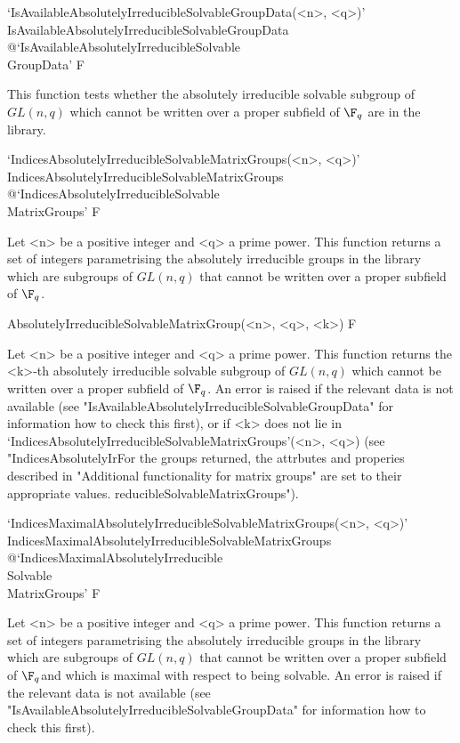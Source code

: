 \>`IsAvailableAbsolutelyIrreducibleSolvableGroupData(<n>, <q>)'%
{IsAvailableAbsolutelyIrreducibleSolvableGroupData}%
@{`IsAvailableAbsolutelyIrreducibleSolvable\\GroupData'} F

This function tests whether the
absolutely irreducible solvable subgroup of $GL(n,q)$ which
cannot be written over a proper subfield of $\F_q$ are in the {\IRREDSOL} library.


\>`IndicesAbsolutelyIrreducibleSolvableMatrixGroups(<n>, <q>)'%
{IndicesAbsolutelyIrreducibleSolvableMatrixGroups}%
@{`IndicesAbsolutelyIrreducibleSolvable\\MatrixGroups'} F

Let <n> be a  positive integer and <q> a prime power. This
function returns a set of integers parametrising the absolutely irreducible groups in the
{\IRREDSOL} library which are subgroups of $GL(n,q)$ that cannot be written over a proper
subfield of
$\F_q$.


\>AbsolutelyIrreducibleSolvableMatrixGroup(<n>, <q>, <k>) F

Let <n> be a  positive integer and <q> a prime power. This
function returns the <k>-th absolutely irreducible solvable subgroup of $GL(n,q)$ which
cannot be written over a proper subfield of $\F_q$. An error is raised if the relevant
data is not available (see "IsAvailableAbsolutelyIrreducibleSolvableGroupData" for information 
how to check this first), or if <k> does not lie in
`IndicesAbsolutelyIrreducibleSolvableMatrixGroups'(<n>, <q>)
(see "IndicesAbsolutelyIrFor the groups returned, the attrbutes and properies described in
"Additional functionality for matrix groups" are set to their appropriate values.
reducibleSolvableMatrixGroups").


\>`IndicesMaximalAbsolutelyIrreducibleSolvableMatrixGroups(<n>, <q>)'%
{IndicesMaximalAbsolutelyIrreducibleSolvableMatrixGroups}%
@{`IndicesMaximalAbsolutelyIrreducible\\Solvable\\MatrixGroups'} F

Let <n> be a  positive integer and <q> a prime power. This
function returns a set of integers parametrising the absolutely irreducible groups in the
{\IRREDSOL} library which are subgroups of $GL(n,q)$ that cannot be written over a proper
subfield of
$\F_q $and which is maximal with
respect to being solvable. An error is raised if the relevant
data is not available (see "IsAvailableAbsolutelyIrreducibleSolvableGroupData" for information 
how to check this first).

